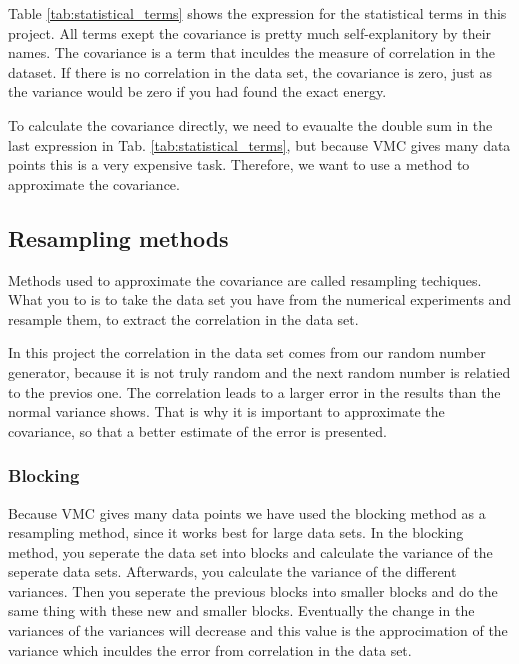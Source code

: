 Table \ref{tab:statistical_terms} shows the expression for the statistical terms in this project. All terms exept the covariance is pretty much self-explanitory by their names. The covariance is a term that inculdes the measure of correlation in the dataset. If there is no correlation in the data set, the covariance is zero, just as the variance would be zero if you had found the exact energy. 

To calculate the covariance directly, we need to evaualte the double sum in the last expression in Tab. \ref{tab:statistical_terms}, but because VMC gives many data points this is a very expensive task. Therefore, we want to use a method to approximate the covariance. 

\subsection{Resampling methods}

Methods used to approximate the covariance are called resampling techiques. What you to is to take the data set you have from the numerical experiments and resample them, to extract the correlation in the data set. 

In this project the correlation in the data set comes from our random number generator, because it is not truly random and the next random number is relatied to the previos one. The correlation leads to a larger error in the results than the normal variance shows. That is why it is important to approximate the covariance, so that a better estimate of the error is presented.

\subsubsection{Blocking}

Because VMC gives many data points we have used the blocking method as a resampling method, since it works best for large data sets. In the blocking method, you seperate the data set into blocks and calculate the variance of the seperate data sets. Afterwards, you calculate the variance of the different variances. Then you seperate the previous blocks into smaller blocks and do the same thing with these new and smaller blocks. Eventually the change in the variances of the variances will decrease and this value is the approcimation of the variance which inculdes the error from correlation in the data set.

%
